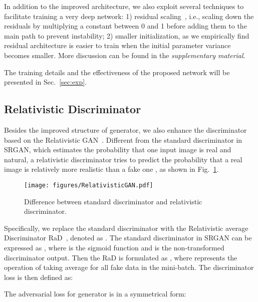 \documentclass[runningheads]{llncs}
\begin{document}
In addition to the improved architecture, we also exploit several techniques to facilitate training a very deep 
network: 1)  residual scaling~\cite{szegedy2016inception,lim2017enhanced}, i.e., scaling down the residuals by 
multiplying a constant between 0 and 1 before adding them to the main path to prevent instability; 
2) smaller initialization, as we empirically find residual architecture is easier to train when the initial parameter 
variance becomes smaller. More discussion can be found in the \textit{supplementary material}.

The training details and the effectiveness of the proposed network will be presented in Sec.~\ref{sec:exp}.


\subsection{Relativistic Discriminator}

Besides the improved structure of generator, we also enhance the discriminator based on the Relativistic 
GAN~\cite{jolicoeur2018relativistic}. 
Different from the standard discriminator  in SRGAN, which estimates the probability that one input image  is 
real and natural, a relativistic discriminator tries to predict the probability that a real image  is relatively 
more realistic than a fake one , as shown in Fig.~\ref{fig:RelativisticGAN}.

\begin{figure}[htbp]
	\begin{center}
		\texttt{[image: figures/RelativisticGAN.pdf]}
	\end{center}
	\vspace{-0.4cm}
	\caption{Difference between standard discriminator and relativistic discriminator.}
	\label{fig:RelativisticGAN}
	\vspace{-0.4cm}
\end{figure}

Specifically, we replace the standard discriminator with the Relativistic average Discriminator 
RaD~\cite{jolicoeur2018relativistic}, denoted as . The standard discriminator in SRGAN can be expressed as 
, where  is the sigmoid 
function and  is the non-transformed discriminator output. Then the RaD is formulated as , where  represents the operation of taking 
average for all fake data in the mini-batch. The discriminator loss is then defined as:

The adversarial loss for generator is in a symmetrical form:
\end{document}
